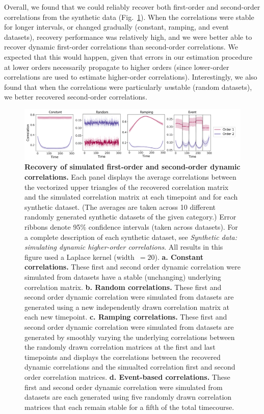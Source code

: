 \documentclass[english]{article}
\begin{document}
Overall, we found that we could reliably recover both first-order and
second-order correlations from the synthetic data
(Fig.~\ref{fig:higher_order_sims}).  When the correlations were stable
for longer intervals, or changed gradually (constant, ramping, and
event datasets), recovery performance was relatively high, and we were
better able to recover dynamic first-order correlations than
second-order correlations.  We expected that this would happen, given
that errors in our estimation procedure at lower orders necessarily
propagate to higher orders (since lower-order correlations are used to
estimate higher-order correlations).  Interestingly, we also found
that when the correlations were particularly \textit{un}stable (random
datasets), we better recovered second-order correlations.

\begin{figure}[tp]
  \centering
  \includegraphics[width=\textwidth]{figs/higher_order_sims}
  \caption{\textbf{Recovery of simulated first-order and second-order dynamic correlations.}  Each panel displays the average correlations
    between the vectorized upper triangles of the recovered
    correlation matrix and the simulated correlation matrix at each
    timepoint and for each synthetic dataset.  (The averages are taken across 10 different
    randomly generated synthetic datasets of the given category.)
    Error ribbons denote 95\% confidence intervals (taken across
    datasets).  For a complete description of each synthetic dataset,
    see \textit{Synthetic data: simulating dynamic higher-order
      correlations}.  All results in this figure used a Laplace kernel
    (width~$=20$).  \textbf{a. Constant correlations.}
    These first and second order dynamic correlation were
    simulated from datasets have a stable (unchanging) underlying correlation
    matrix.  \textbf{b. Random correlations.}  These first and second order dynamic correlation were
    simulated from datasets are
    generated using a new independently drawn correlation matrix at
    each new timepoint.  \textbf{c. Ramping correlations.}  These first and second order dynamic correlation were
    simulated from
    datasets are generated by smoothly varying the underlying
    correlations between the randomly drawn correlation matrices at
    the first and last timepoints and displays the
    correlations between the recovered dynamic correlations and the
  simualted correlation first and second order correlation matrices.   \textbf{d. Event-based correlations.}  These first and second order dynamic correlation were
    simulated from datasets are
    each generated using five randomly drawn correlation matrices that
    each remain stable for a fifth of the total timecourse.  }
  \label{fig:higher_order_sims}
\end{figure}
\end{document}
